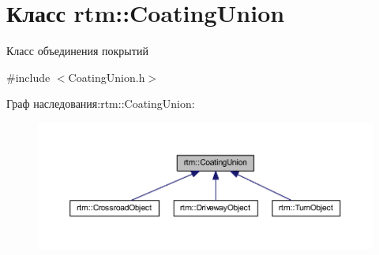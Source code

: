 \hypertarget{classrtm_1_1_coating_union}{}\section{Класс rtm\+:\+:Coating\+Union}
\label{classrtm_1_1_coating_union}


Класс объединения покрытий  




{\ttfamily \#include $<$Coating\+Union.\+h$>$}



Граф наследования\+:rtm\+:\+:Coating\+Union\+:
\nopagebreak
\begin{figure}[H]
\begin{center}
\leavevmode
\includegraphics[width=350pt]{classrtm_1_1_coating_union__inherit__graph}
\end{center}
\end{figure}
